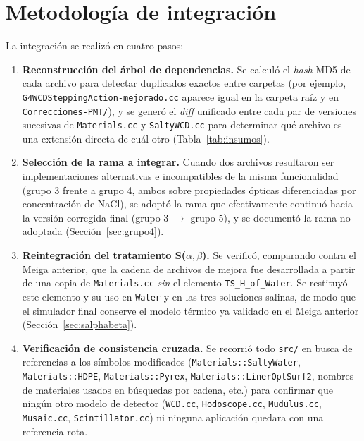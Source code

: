 \documentclass[11pt,a4paper]{article}
\newcommand{\codigo}[1]{\nolinkurl{#1}}
\begin{document}
\section{Metodología de integración}
\label{sec:metodologia}

La integración se realizó en cuatro pasos:

\begin{enumerate}
  \item \textbf{Reconstrucción del árbol de dependencias.} Se calculó el
    \emph{hash} MD5 de cada archivo para detectar duplicados exactos entre
    carpetas (por ejemplo, \codigo{G4WCDSteppingAction-mejorado.cc} aparece
    igual en la carpeta raíz y en \codigo{Correcciones-PMT/}), y se generó
    el \emph{diff} unificado entre cada par de versiones sucesivas de
    \codigo{Materials.cc} y \codigo{SaltyWCD.cc} para determinar qué
    archivo es una extensión directa de cuál otro (Tabla~\ref{tab:insumos}).
  \item \textbf{Selección de la rama a integrar.} Cuando dos archivos
    resultaron ser implementaciones alternativas e incompatibles de la
    misma funcionalidad (grupo 3 frente a grupo 4, ambos sobre
    propiedades ópticas diferenciadas por concentración de NaCl), se
    adoptó la rama que efectivamente continuó hacia la versión corregida
    final (grupo 3 $\to$ grupo 5), y se documentó la rama no adoptada
    (Sección~\ref{sec:grupo4}).
  \item \textbf{Reintegración del tratamiento S($\alpha,\beta$).} Se
    verificó, comparando contra el Meiga anterior, que la cadena de
    archivos de mejora fue desarrollada a partir de una copia de
    \codigo{Materials.cc} \emph{sin} el elemento
    \codigo{TS\_H\_of\_Water}. Se restituyó este elemento y su uso en
    \codigo{Water} y en las tres soluciones salinas, de modo que el
    simulador final conserve el modelo térmico ya validado en el Meiga
    anterior (Sección~\ref{sec:salphabeta}).
  \item \textbf{Verificación de consistencia cruzada.} Se recorrió todo
    \codigo{src/} en busca de referencias a los símbolos modificados
    (\codigo{Materials::SaltyWater}, \codigo{Materials::HDPE},
    \codigo{Materials::Pyrex}, \codigo{Materials::LinerOptSurf2}, nombres
    de materiales usados en búsquedas por cadena, etc.) para confirmar que
    ningún otro modelo de detector (\codigo{WCD.cc}, \codigo{Hodoscope.cc},
    \codigo{Mudulus.cc}, \codigo{Musaic.cc}, \codigo{Scintillator.cc}) ni
    ninguna aplicación quedara con una referencia rota.
\end{enumerate}
\end{document}

